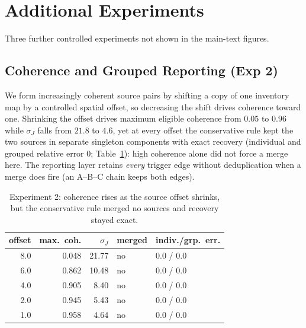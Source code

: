 \section{Additional Experiments}
\label{app:additional_experiments}

Three further controlled experiments not shown in the main-text figures.

\subsection{Coherence and Grouped Reporting (Exp 2)}
\label{subsec:results_h2}
We form increasingly coherent source pairs by shifting a copy of one inventory map by
a controlled spatial offset, so decreasing the shift drives coherence toward one.
Shrinking the offset drives maximum eligible coherence from $0.05$ to $0.96$ while
$\sigma_J$ falls from $21.8$ to $4.6$, yet at every offset the conservative rule kept
the two sources in separate singleton components with exact recovery (individual and
grouped relative error $0$; Table~\ref{tab:results_h2}): high coherence alone did not
force a merge here. The reporting layer retains \emph{every} trigger edge without
deduplication when a merge does fire (an A--B--C chain keeps both edges).
\begin{table}[t]
\centering
\footnotesize
\caption{Experiment 2: coherence rises as the source offset shrinks, but the
conservative rule merged no sources and recovery stayed exact.}
\label{tab:results_h2}
\begin{tabular}{rrrll}
\toprule
offset & max.\ coh. & $\sigma_J$ & merged & indiv./grp.\ err. \\
\midrule
8.0 & 0.048 & 21.77 & no & 0.0 / 0.0 \\
6.0 & 0.862 & 10.48 & no & 0.0 / 0.0 \\
4.0 & 0.905 & 8.40  & no & 0.0 / 0.0 \\
2.0 & 0.945 & 5.43  & no & 0.0 / 0.0 \\
1.0 & 0.958 & 4.64  & no & 0.0 / 0.0 \\
\bottomrule
\end{tabular}
\end{table}


